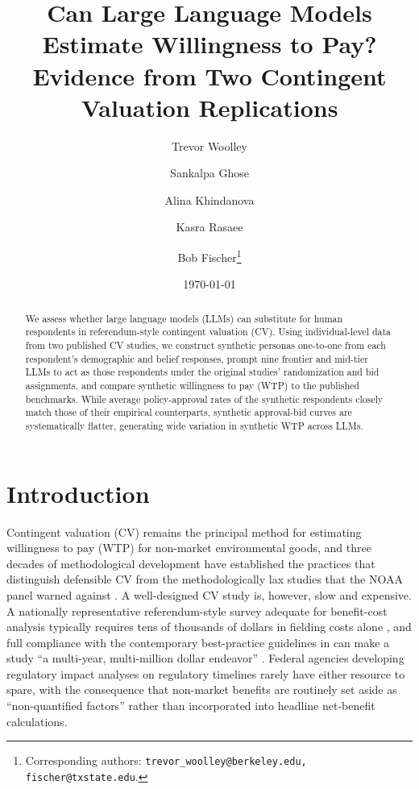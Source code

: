 \documentclass[12pt]{article}
\title{Can Large Language Models Estimate Willingness to Pay? \\ Evidence from Two Contingent Valuation Replications}
\date{\today}
\author[1]{Trevor Woolley}
\author[2, 5]{Sankalpa Ghose}
\author[3]{Alina Khindanova}
\author[5]{Kasra Rasaee}
\author[4]{Bob Fischer\thanks{Corresponding authors: \texttt{trevor\_woolley@berkeley.edu, fischer@txstate.edu}.}}
\affil[1]{\textit{University of California, Berkeley}}
\affil[2]{\textit{National University of Singapore}}
\affil[3]{\textit{University of Texas at San Antonio}}
\affil[4]{\textit{Texas State University}}
\affil[5]{\textit{Alethic Research}}
\begin{document}

\maketitle


\footnotesize
\begin{abstract}
We assess whether large language models (LLMs) can substitute for human
respondents in referendum-style contingent valuation (CV). Using
individual-level data from two published CV studies, we construct
synthetic personas one-to-one from each respondent's demographic and
belief responses, prompt nine frontier and mid-tier LLMs to act as those
respondents under the original studies' randomization and bid
assignments, and compare synthetic willingness to pay (WTP) to the
published benchmarks. While average policy-approval rates of the synthetic respondents closely match those of their empirical counterparts, synthetic approval-bid curves are systematically flatter, generating wide variation in synthetic WTP across LLMs. 

\end{abstract}

\newpage

%

\section{Introduction}\label{sec:intro}

Contingent valuation (CV) remains the principal method for estimating
willingness to pay (WTP) for non-market environmental goods, and three decades
of methodological development have established the practices that distinguish
defensible CV from the methodologically lax studies that the NOAA panel
warned against \parencite{Arrow1993, Johnston2017}. A well-designed CV study
is, however, slow and expensive. A nationally representative
referendum-style survey adequate for benefit-cost analysis typically requires
tens of thousands of dollars in fielding costs alone \parencite{Champ2017},
and full compliance with the contemporary best-practice guidelines in
\textcite{Johnston2017} can make a study ``a multi-year, multi-million
dollar endeavor'' \parencite{Whitehead2023}. Federal
agencies developing regulatory impact analyses on regulatory timelines
rarely have either resource to spare, with the consequence that non-market
benefits are routinely set aside as ``non-quantified factors'' rather than
incorporated into headline net-benefit calculations.
\end{document}
